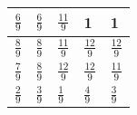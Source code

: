 \documentclass[12pt]{article}
\begin{document}
\begin{center}
\begin{tabular}{|l|l|l|l|l|}
\hline
\hspace{1mm}$\frac{6}{9}$ & \hspace{1mm}$\frac{6}{9}$ & \hspace{1mm}$\frac{11}{9}$ & \hspace{1mm}1 & \hspace{1mm}1\\ \hline
\hspace{1mm}$\frac{8}{9}$  & \hspace{1mm}$\frac{8}{9}$ & \hspace{1mm}$\frac{11}{9}$ & \hspace{1mm}$\frac{12}{9}$ &$\frac{12}{9}$  \hspace{1mm} \\ \hline
\hspace{1mm}$\frac{7}{9}$ & \hspace{1mm}$\frac{8}{9}$ & \hspace{1mm}$\frac{12}{9}$ & \hspace{1mm}$\frac{12}{9}$ & $\frac{11}{9}$ \hspace{1mm}\\ \hline
\hspace{1mm}$\frac{2}{9}$& \hspace{1mm}$\frac{3}{9}$& \hspace{1mm}$\frac{1}{9}$& \hspace{1mm}$\frac{4}{9}$&$\frac{3}{9}$ \hspace{1mm} \\ \hline
\end{tabular}
\end{center}
\end{document}
